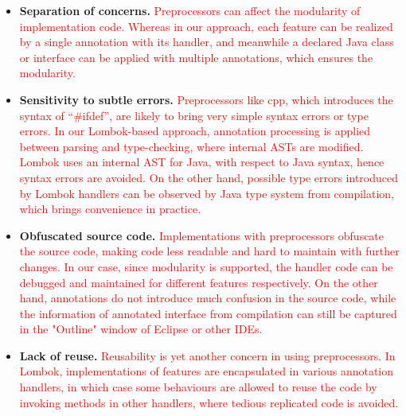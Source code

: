 \begin{itemize}
\item \textbf{Separation of concerns.} \textcolor{red}{Preprocessors can affect the modularity of implementation code. Whereas in our approach,
each feature can be realized by a single annotation with its handler, and meanwhile a declared Java class or interface
can be applied with multiple annotations, which ensures the modularity.}
\item \textbf{Sensitivity to subtle errors.} \textcolor{red}{Preprocessors like cpp, which introduces the syntax of ``\#ifdef'', are likely to
bring very simple syntax errors or type errors. In our Lombok-based approach, annotation processing is applied between
parsing and type-checking, where internal ASTs are modified. Lombok uses an internal AST for Java, with respect to
Java syntax, hence syntax errors are avoided. On the other hand, possible type errors introduced by Lombok handlers
can be observed by Java type system from compilation, which brings convenience in practice.}
\item \textbf{Obfuscated source code.} \textcolor{red}{Implementations with preprocessors obfuscate the source code, making code less readable
and hard to maintain with further changes. In our case, since modularity is supported, the handler code can be debugged
and maintained for different features respectively. On the other hand, annotations do not introduce much confusion in
the source code, while the information of annotated interface from compilation can still be captured in the "Outline" window
of Eclipse or other IDEs.}
\item \textbf{Lack of reuse.} \textcolor{red}{Reusability is yet another concern in using preprocessors. In Lombok, implementations of features are
encapsulated in various annotation handlers, in which case some behaviours are allowed to reuse the code by invoking methods
in other handlers, where tedious replicated code is avoided.}
\end{itemize}

